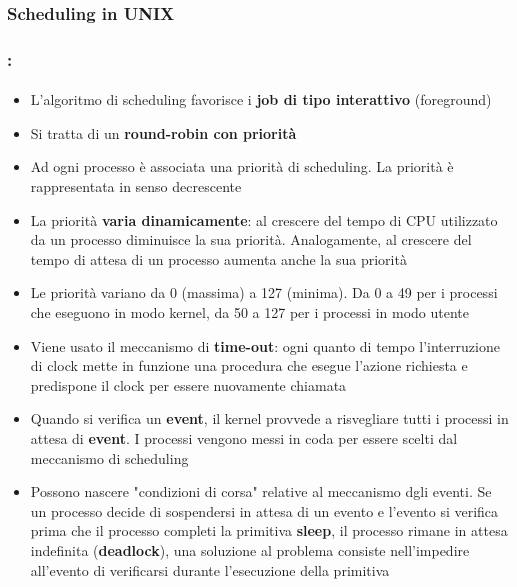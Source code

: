 \documentclass{beamer}
\begin{document}
\subsubsection{Scheduling in UNIX}
\begin{frame}
	\frametitle{\insertsubsection: \insertsubsubsection}
	\framesubtitle{\insertsection}
	\begin{itemize}
		\item L'algoritmo di scheduling favorisce i \textbf{job di tipo interattivo} (foreground)
		\item Si tratta di un \textbf{round-robin con priorità}
		\item Ad ogni processo è associata una priorità di scheduling. La priorità è rappresentata in senso decrescente
		\item La priorità \textbf{varia dinamicamente}: al crescere del tempo di CPU utilizzato da un processo diminuisce la sua priorità. Analogamente, al crescere del tempo di attesa di un processo aumenta anche la sua priorità
		\item Le priorità variano da 0 (massima) a 127 (minima). Da 0 a 49 per i processi che eseguono in modo kernel, da 50 a 127 per i processi in modo utente
	\end{itemize}
\end{frame}
\begin{frame}
	\begin{itemize}
		\item Viene usato il meccanismo di \textbf{time-out}: ogni quanto di tempo l'interruzione di clock mette in funzione una procedura che esegue l'azione richiesta e predispone il clock per essere nuovamente chiamata
		\item Quando si verifica un \textbf{event}, il kernel provvede a risvegliare tutti i processi in attesa di \textbf{event}. I processi vengono messi in coda per essere scelti dal meccanismo di scheduling
		\item Possono nascere "condizioni di corsa" relative al meccanismo dgli eventi. Se un processo decide di sospendersi in attesa di un evento e l'evento si verifica prima che il processo completi la primitiva \textbf{sleep}, il processo rimane in attesa indefinita (\textbf{deadlock}), una soluzione al problema consiste nell'impedire all'evento di verificarsi durante l'esecuzione della primitiva
	\end{itemize}
\end{frame}
\end{document}

